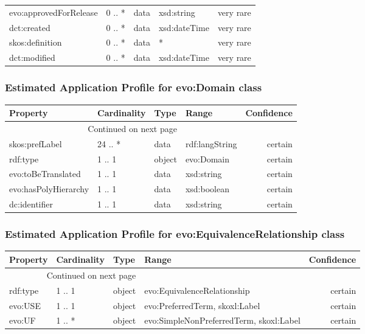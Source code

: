 \documentclass[10pt,a4paper,titlepage,final]{article}
\begin{document}
\begin{tabularx}{\textwidth}{lllXr}
 evo:approvedForRelease &      0 .. * &    data &                                         xsd:string &  very rare \\
            dct:created &      0 .. * &    data &                                       xsd:dateTime &  very rare \\
        skos:definition &      0 .. * &    data &                                                  * &  very rare \\
           dct:modified &      0 .. * &    data &                                       xsd:dateTime &  very rare \\
\end{tabularx}


\subsubsection{Estimated Application Profile for evo:Domain class}
\begin{tabularx}{\textwidth}{lllXr}
\toprule
             Property & Cardinality &    Type &           Range & Confidence \\
\midrule
\endhead
\midrule
\multicolumn{3}{r}{{Continued on next page}} \\
\midrule
\endfoot

\bottomrule
\endlastfoot
       skos:prefLabel &     24 .. * &    data &  rdf:langString &    certain \\
             rdf:type &      1 .. 1 &  object &      evo:Domain &    certain \\
   evo:toBeTranslated &      1 .. 1 &    data &      xsd:string &    certain \\
 evo:hasPolyHierarchy &      1 .. 1 &    data &     xsd:boolean &    certain \\
        dc:identifier &      1 .. 1 &    data &      xsd:string &    certain \\
\end{tabularx}


\subsubsection{Estimated Application Profile for evo:EquivalenceRelationship class}
\begin{tabularx}{\textwidth}{lllXr}
\toprule
 Property & Cardinality &    Type &                                    Range & Confidence \\
\midrule
\endhead
\midrule
\multicolumn{3}{r}{{Continued on next page}} \\
\midrule
\endfoot

\bottomrule
\endlastfoot
 rdf:type &      1 .. 1 &  object &              evo:EquivalenceRelationship &    certain \\
  evo:USE &      1 .. 1 &  object &           evo:PreferredTerm, skoxl:Label &    certain \\
   evo:UF &      1 .. * &  object &  evo:SimpleNonPreferredTerm, skoxl:Label &    certain \\
\end{tabularx}
\end{document}
